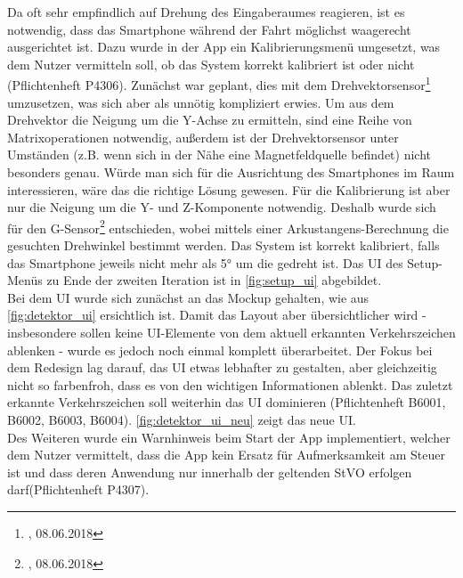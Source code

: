 \documentclass[12pt,a4paper,ngerman,enabledeprecatedfontcommands]{scrreprt}
\begin{document}
Da  oft sehr empfindlich auf Drehung des Eingaberaumes reagieren, ist es notwendig, dass das \gls{Smartphone} während der Fahrt möglichst waagerecht ausgerichtet ist. Dazu wurde in der \gls{App} ein Kalibrierungsmenü umgesetzt, was dem \gls{Nutzer} vermitteln soll, ob das \gls{System} korrekt kalibriert ist oder nicht (Pflichtenheft P4306). Zunächst war geplant, dies mit dem Drehvektorsensor\footnote{, 08.06.2018} umzusetzen, was sich aber als unnötig kompliziert erwies. Um aus dem Drehvektor die Neigung um die Y-Achse zu ermitteln, sind eine Reihe von Matrixoperationen notwendig, außerdem ist der Drehvektorsensor unter Umständen (z.B. wenn sich in der Nähe eine Magnetfeldquelle befindet) nicht besonders genau. Würde man sich für die Ausrichtung des \gls{Smartphone}s im Raum interessieren, wäre das die richtige Lösung gewesen. Für die Kalibrierung ist aber nur die Neigung um die Y- und Z-Komponente notwendig. Deshalb wurde sich für den G-Sensor\footnote{, 08.06.2018} entschieden, wobei mittels einer Arkustangens-Berechnung die gesuchten Drehwinkel bestimmt werden. Das \gls{System} ist korrekt kalibriert, falls das \gls{Smartphone} jeweils nicht mehr als 5° um die  gedreht ist. Das \gls{UI} des Setup-Menüs zu Ende der zweiten Iteration ist in \cref{fig:setup_ui} abgebildet.\\

Bei dem \gls{UI} wurde sich zunächst an das Mockup gehalten, wie aus \cref{fig:detektor_ui} ersichtlich ist. Damit das Layout aber übersichtlicher wird - insbesondere sollen keine UI-Elemente von dem aktuell erkannten Verkehrszeichen ablenken - wurde es jedoch noch einmal komplett überarbeitet. Der Fokus bei dem Redesign lag darauf, das \gls{UI} etwas lebhafter zu gestalten, aber gleichzeitig nicht so farbenfroh, dass es von den wichtigen Informationen ablenkt. Das zuletzt erkannte Verkehrszeichen soll weiterhin das \gls{UI} dominieren (Pflichtenheft B6001, B6002, B6003, B6004). \cref{fig:detektor_ui_neu} zeigt das neue \gls{UI}.\\

Des Weiteren wurde ein Warnhinweis beim Start der \gls{App} implementiert, welcher dem Nutzer vermittelt, dass die \gls{App} kein Ersatz für Aufmerksamkeit am Steuer ist und dass deren Anwendung nur innerhalb der geltenden StVO erfolgen darf(Pflichtenheft P4307).
\end{document}

